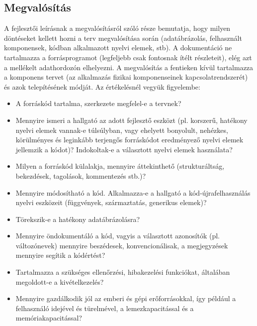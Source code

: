 \subsection{Megvalósítás}
A fejlesztői leírásnak a megvalósításról szóló része bemutatja, hogy milyen döntéseket kellett hozni a terv megvalósítása során (adatábrázolás, felhasznált komponensek, kódban alkalmazott nyelvi elemek, stb). A dokumentáció ne tartalmazza a forrásprogramot (legfeljebb csak fontosnak ítélt részleteit), elég azt a mellékelt adathordozón elhelyezni. A megvalósítás a fentieken kívül tartalmazza a komponens tervet (az alkalmazás fizikai komponenseinek kapcsolatrendszerét) és azok telepítésének módját.
    Az értékelésnél vegyük figyelembe:
\begin{itemize}
    \item A forráskód tartalma, szerkezete megfelel-e a tervnek?
    \item Mennyire ismeri a hallgató az adott fejlesztő eszközt (pl. korszerű, hatékony nyelvi elemek vannak-e túlsúlyban, vagy ehelyett bonyolult, nehézkes, körülményes és leginkább terjengős forráskódot eredményező nyelvi elemek jellemzik a kódot)? Indokoltak-e a választott nyelvi elemek használata?
    \item Milyen a forráskód külalakja, mennyire áttekinthető (strukturáltság, bekezdések, tagolások, kommentezés stb.)?
    \item Mennyire módosítható a kód. Alkalmazza-e a hallgató a kód-újrafelhasználás nyelvi eszközeit (függvények, származtatás, generikus elemek)?
    \item Törekszik-e a hatékony adatábrázolásra?
    \item Mennyire öndokumentáló a kód, vagyis a választott azonosítók (pl. változónevek) mennyire beszédesek, konvencionálisak, a megjegyzések mennyire segítik a kódértést?
    \item Tartalmazza a szükséges ellenőrzési, hibakezelési funkciókat, általában megoldott-e a kivételkezelés?
    \item Mennyire gazdálkodik jól az emberi és gépi erőforrásokkal, így például a felhasználó idejével és türelmével, a lemezkapacitással és a memóriakapacitással?
\end{itemize}


